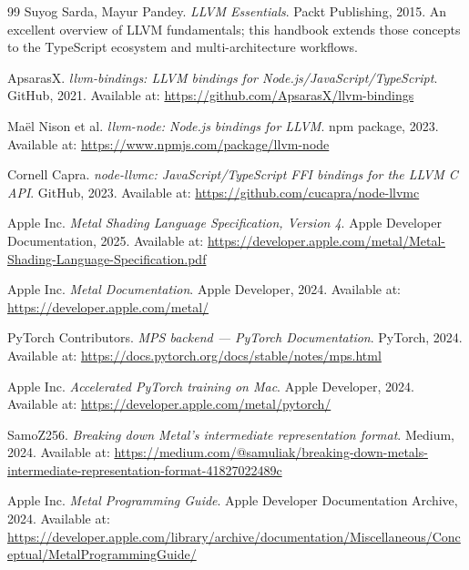 \documentclass[11pt,oneside]{book}
\begin{document}
\begin{thebibliography}{99}
Suyog Sarda, Mayur Pandey. \textit{LLVM Essentials}. Packt Publishing, 2015. An excellent overview of LLVM fundamentals; this handbook extends those concepts to the TypeScript ecosystem and multi-architecture workflows.

ApsarasX. \textit{llvm-bindings: LLVM bindings for Node.js/JavaScript/TypeScript}. GitHub, 2021. Available at: \url{https://github.com/ApsarasX/llvm-bindings}

Maël Nison et al. \textit{llvm-node: Node.js bindings for LLVM}. npm package, 2023. Available at: \url{https://www.npmjs.com/package/llvm-node}

Cornell Capra. \textit{node-llvmc: JavaScript/TypeScript FFI bindings for the LLVM C API}. GitHub, 2023. Available at: \url{https://github.com/cucapra/node-llvmc}

Apple Inc. \textit{Metal Shading Language Specification, Version 4}. Apple Developer Documentation, 2025. Available at: \url{https://developer.apple.com/metal/Metal-Shading-Language-Specification.pdf}

Apple Inc. \textit{Metal Documentation}. Apple Developer, 2024. Available at: \url{https://developer.apple.com/metal/}

PyTorch Contributors. \textit{MPS backend --- PyTorch Documentation}. PyTorch, 2024. Available at: \url{https://docs.pytorch.org/docs/stable/notes/mps.html}

Apple Inc. \textit{Accelerated PyTorch training on Mac}. Apple Developer, 2024. Available at: \url{https://developer.apple.com/metal/pytorch/}

SamoZ256. \textit{Breaking down Metal's intermediate representation format}. Medium, 2024. Available at: \url{https://medium.com/@samuliak/breaking-down-metals-intermediate-representation-format-41827022489c}

Apple Inc. \textit{Metal Programming Guide}. Apple Developer Documentation Archive, 2024. Available at: \url{https://developer.apple.com/library/archive/documentation/Miscellaneous/Conceptual/MetalProgrammingGuide/}
\end{thebibliography}
\end{document}
